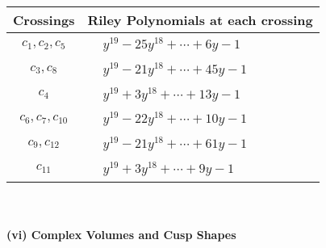 \documentclass[1p]{elsarticle_modified}
\theoremstyle{definition}
\begin{document}
\begin{tabular}{m{50pt}|m{274pt}}
Crossings & \hspace{64pt}Riley Polynomials at each crossing \\
\hline $$\begin{aligned}c_{1},c_{2},c_{5}\end{aligned}$$&$\begin{aligned}
&y^{19}-25 y^{18}+\cdots+6 y-1
\end{aligned}$\\
\hline $$\begin{aligned}c_{3},c_{8}\end{aligned}$$&$\begin{aligned}
&y^{19}-21 y^{18}+\cdots+45 y-1
\end{aligned}$\\
\hline $$\begin{aligned}c_{4}\end{aligned}$$&$\begin{aligned}
&y^{19}+3 y^{18}+\cdots+13 y-1
\end{aligned}$\\
\hline $$\begin{aligned}c_{6},c_{7},c_{10}\end{aligned}$$&$\begin{aligned}
&y^{19}-22 y^{18}+\cdots+10 y-1
\end{aligned}$\\
\hline $$\begin{aligned}c_{9},c_{12}\end{aligned}$$&$\begin{aligned}
&y^{19}-21 y^{18}+\cdots+61 y-1
\end{aligned}$\\
\hline $$\begin{aligned}c_{11}\end{aligned}$$&$\begin{aligned}
&y^{19}+3 y^{18}+\cdots+9 y-1
\end{aligned}$\\
\hline
\end{tabular}\\~\\
\newpage\flushleft \textbf{(vi) Complex Volumes and Cusp Shapes}
\end{document}
